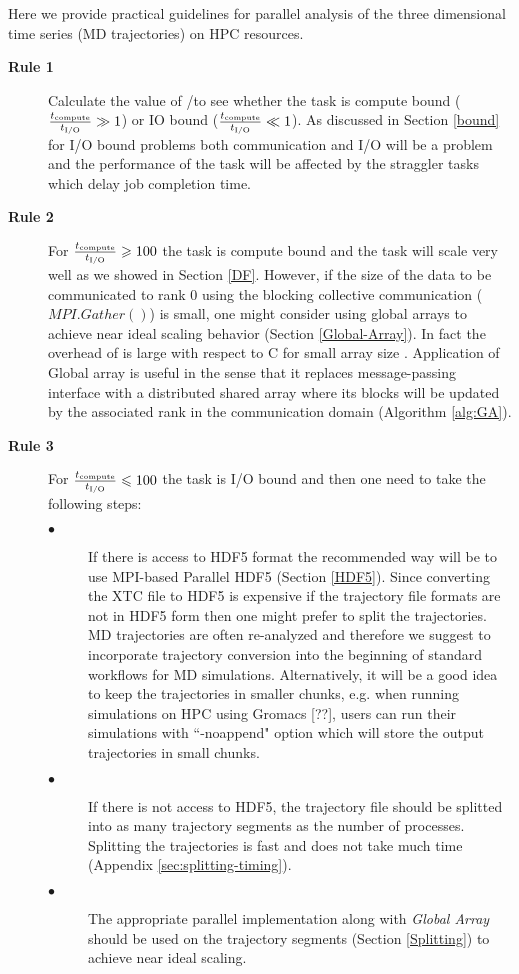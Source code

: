 \label{guideline}
Here we provide practical guidelines for parallel analysis of the three dimensional time series (MD trajectories) on HPC resources.

\begin{description}
  \item[\textbf{Rule 1}] Calculate the value of \tcomp/\tIO to see whether the task is compute bound ($\frac{{t}_{\text{compute}}}{{t}_{\text{I/O}}} \gg 1$) or IO bound ($\frac{{t}_{\text{compute}}}{{t}_{\text{I/O}}} \ll 1$). As discussed in Section \ref{bound} for I/O bound problems both communication and I/O will be a problem and the performance of the task will be affected by the straggler tasks which delay job completion time.  
  
  \item[\textbf{Rule 2}] For $\frac{{t}_{\text{compute}}}{{t}_{\text{I/O}}} \geqslant 100$ the task is compute bound and the task will scale very well as we showed in Section \ref{DF}. However, if the size of the data to be communicated to rank 0 using the blocking collective communication ($MPI.Gather()$) is small, one might consider using global arrays to achieve near ideal scaling behavior (Section \ref{Global-Array}). In fact the overhead of  is large with respect to C for small array size \cite{Dalcin:2011aa}. Application of Global array is useful in the sense that it replaces message-passing interface with a distributed shared array where its blocks will be updated by the associated rank in the communication domain (Algorithm \ref{alg:GA}). 
  \item[\textbf{Rule 3}] For $\frac{{t}_{\text{compute}}}{{t}_{\text{I/O}}} \leqslant 100$ the task is I/O bound and then one need to take the following steps:
   
\begin{description}
  \item[$\bullet$] If there is access to HDF5 format the recommended way will be to use MPI-based Parallel HDF5 (Section \ref{HDF5}). Since converting the XTC file to HDF5 is expensive if the trajectory file formats are not in HDF5 form then one might prefer to split the trajectories. MD trajectories are often re-analyzed and therefore we suggest to incorporate trajectory conversion into the beginning of standard workflows for MD simulations. 
 Alternatively, it will be a good idea to keep the trajectories in smaller chunks, e.g. when running simulations on HPC using Gromacs [??], users can run their simulations with ``-noappend" option which will store the output trajectories in small chunks.
  \item[$\bullet$] If there is not access to HDF5, the trajectory file should be splitted into as many trajectory segments as the number of processes. Splitting the trajectories is fast and does not take much time (Appendix \ref{sec:splitting-timing}).
  \item[$\bullet$] The appropriate parallel implementation along with \emph{Global Array} should be used on the trajectory segments (Section \ref{Splitting}) to achieve near ideal scaling.
\end{description}
\end{description}

